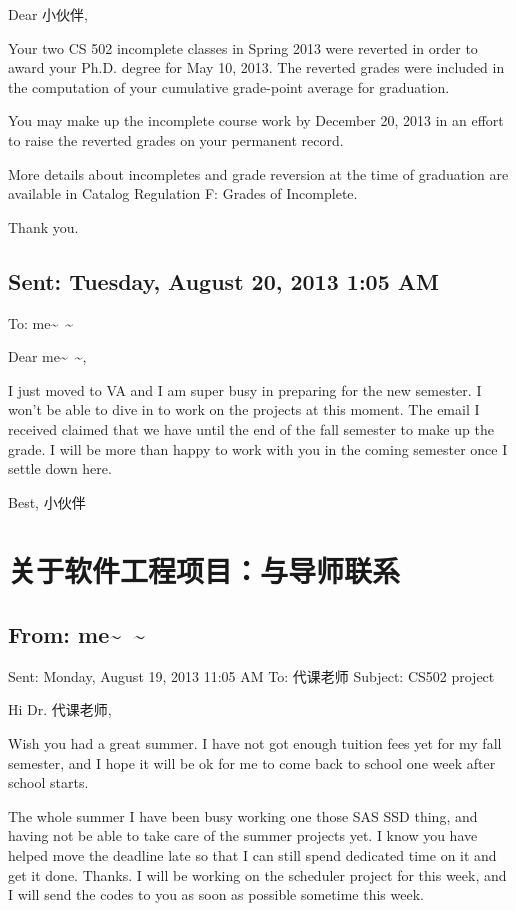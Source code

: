 \documentclass[12pt]{book}
\begin{document}
Dear 小伙伴,

Your two CS 502 incomplete classes in Spring 2013 were reverted in order to award your Ph.D. degree for May 10, 2013. The reverted grades were included in the computation of your cumulative grade-point average for graduation.

You may make up the incomplete course work by December 20, 2013 in an effort to raise the reverted grades on your permanent record.

More details about incompletes and grade reversion at the time of graduation are available in Catalog Regulation F: Grades of Incomplete.

Thank you.

\subsection{Sent: Tuesday, August 20, 2013 1:05 AM}
\label{sec-7-1-6}
To: me\textasciitilde{}~\textasciitilde{}

Dear me\textasciitilde{}~\textasciitilde{},

I just moved to VA and I am super busy in preparing for the new semester. I won't be able to dive in to work on the projects at this moment. The email I received claimed that we have until the end of the fall semester to make up the grade. I will be more than happy to work with you in the coming semester once I settle down here. 

Best,
小伙伴

\section{关于软件工程项目：与导师联系}
\label{sec-7-2}
\subsection{From: me\textasciitilde{}~\textasciitilde{}}
\label{sec-7-2-1}
Sent: Monday, August 19, 2013 11:05 AM
To: 代课老师
Subject: CS502 project

Hi Dr. 代课老师, 

Wish you had a great summer. I have not got enough tuition fees yet for my fall semester, and I hope it will be ok for me to come back to school one week after school starts. 

The whole summer I have been busy working one those SAS SSD thing, and having not be able to take care of the summer projects yet. I know you have helped move the deadline late so that I can still spend dedicated time on it and get it done. Thanks. I will be working on the scheduler project for this week, and I will send the codes to you as soon as possible sometime this week. 
\end{document}
